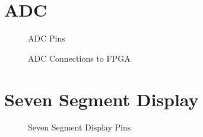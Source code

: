 \documentclass[a4paper,12pt]{article}
\begin{document}
\section{ADC}
\begin{flushleft}
\begin{figure}[H]
	\centering
	\caption{ADC Pins \cite{terasic_2014}}
\end{figure}

\begin{figure}[H]
	\centering
	\caption{ADC Connections to FPGA \cite{terasic_2014}}
\end{figure}
\end{flushleft}
\newpage
\section{Seven Segment Display}
\begin{flushleft}
\begin{figure}[H]
	\centering
	\caption{Seven Segment Display Pins \cite{terasic_2014}}
\end{figure}
\end{flushleft}
\newpage
\end{document}
